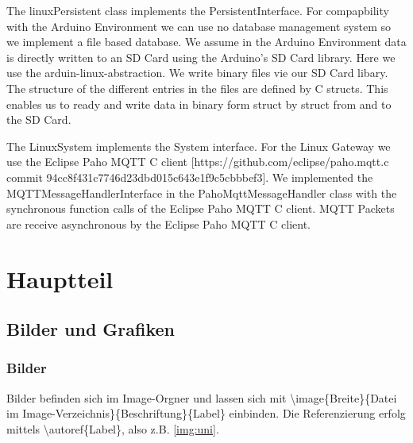 
The linuxPersistent class implements the PersistentInterface.
For compapbility with the Arduino Environment we can use no database management system so we implement a file based database.
We assume in the Arduino Environment data is directly written to an SD Card using the Arduino's SD Card library. Here we use the arduin-linux-abstraction.
We write binary files vie our SD Card libary. The structure of the different entries in the files are defined by C structs.
This enables us to ready and write data in binary form struct by struct from and to the SD Card.

The LinuxSystem implements the System interface.
For the Linux Gateway we use the Eclipse Paho MQTT C client [https://github.com/eclipse/paho.mqtt.c commit 94cc8f431c7746d23dbd015c643e1f9c5cbbbef3]. We implemented the MQTTMessageHandlerInterface in the PahoMqttMessageHandler class with the synchronous function calls of the Eclipse Paho MQTT C client.
MQTT Packets are receive asynchronous by the Eclipse Paho MQTT C client.



\section{Hauptteil}\label{sec:haupt}
\subsection{Bilder und Grafiken}\label{subsec:grafiken}
\subsubsection{Bilder}\label{subsubsec:bilder}
Bilder befinden sich im Image-Orgner und lassen sich mit \textbackslash image\{Breite\}\{Datei im Image-Verzeichnis\}\{Beschriftung\}\{Label\} einbinden.  Die Referenzierung erfolg mittels \textbackslash autoref\{Label\}, also z.B. \autoref{img:uni}.
